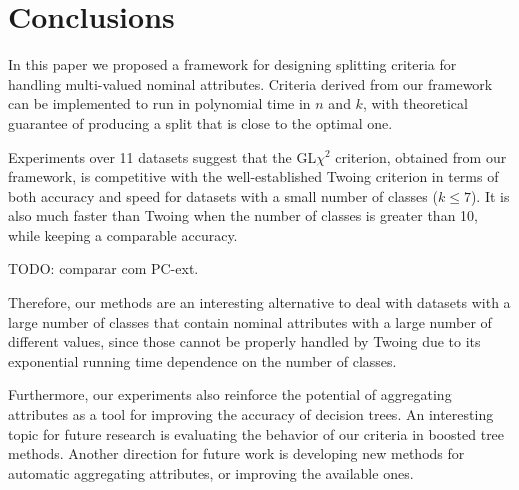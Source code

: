 \newpage

\chapter{Conclusions}
\label{chap:conclusions}

In this paper we proposed a framework for
designing splitting criteria for handling 
multi-valued nominal attributes.
Criteria derived from our framework 
can be implemented to run in polynomial time in
$n$ and $k$, with 
theoretical guarantee of producing a split that is close to the optimal
one.

Experiments over 11 datasets
suggest that the GL$\chi^2$ criterion, obtained from our framework, is competitive with the well-established Twoing criterion in terms of both accuracy and speed for datasets with a small number of classes ($k \leq 7$). It is also much faster than Twoing when the number of classes is greater than 10, while keeping a comparable accuracy.

TODO: comparar com PC-ext.
 
Therefore, our methods are an interesting alternative to deal with
datasets with a large number of classes that contain nominal attributes with a large
number of different values, since those cannot be properly handled by Twoing due to its exponential running time dependence on the number of classes.

Furthermore, our experiments also reinforce
the potential of  aggregating attributes as a tool 
for improving the accuracy of decision trees.
An interesting topic for  future research is evaluating the behavior of our criteria in boosted tree methods.
Another direction for future work is developing new methods for automatic aggregating attributes, or improving the available ones.

